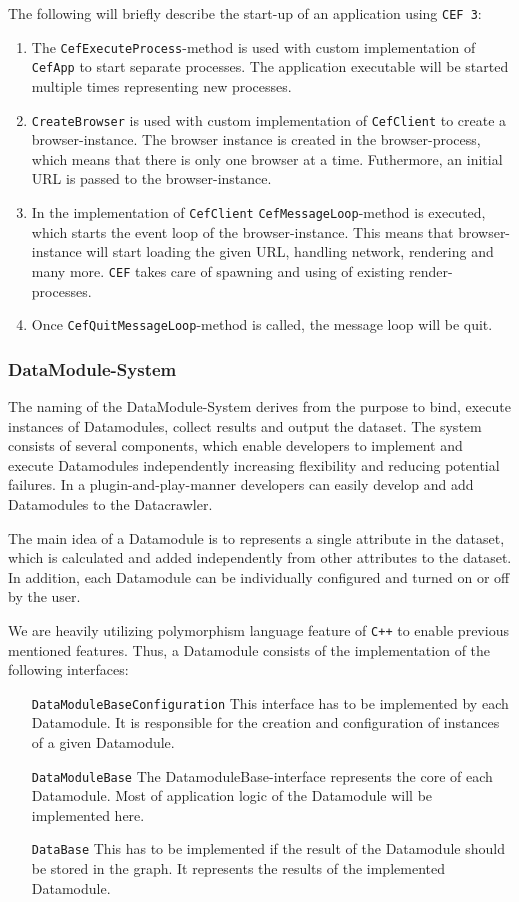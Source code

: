 The following will briefly describe the start-up of an application using \texttt{CEF 3}:
\begin{enumerate}
	\item The \texttt{CefExecuteProcess}-method is used with custom implementation of \texttt{CefApp} to start separate processes. The application executable will be started multiple times representing new processes.
	\item \texttt{CreateBrowser} is used with custom implementation of \texttt{CefClient} to create a browser-instance. The browser instance is created in the browser-process, which means that there is only one browser at a time. Futhermore, an initial URL is passed to the browser-instance.
	\item In the implementation of \texttt{CefClient} \texttt{CefMessageLoop}-method is executed, which starts the event loop of the browser-instance. This means that browser-instance will start loading the given URL, handling network, rendering and many more. \texttt{CEF} takes care of spawning and using of existing render-processes.
	\item Once \texttt{CefQuitMessageLoop}-method is called, the message loop will be quit.
\end{enumerate}

\subsubsection{DataModule-System}
\label{datacrawler_datamodulesystem}
The naming of the DataModule-System derives from the purpose to bind, execute instances of Datamodules, collect results and output the dataset. The system consists of several components, which enable developers to implement and execute Datamodules independently increasing flexibility and reducing potential failures. In a plugin-and-play-manner developers can easily develop and add Datamodules to the Datacrawler.

The main idea of a Datamodule is to represents a single attribute in the dataset, which is calculated and added independently from other attributes to the dataset. In addition, each Datamodule can be individually configured and turned on or off by the user.

 We are heavily utilizing polymorphism language feature of \texttt{C++} to enable previous mentioned features. Thus, a Datamodule consists of the implementation of the following interfaces:

\begin{itemize}
	\item[\texttt{DataModuleBaseConfiguration}] This interface has to be implemented by each Datamodule. It is responsible for the creation and configuration of instances of a given Datamodule.
	\item[\texttt{DataModuleBase}] The DatamoduleBase-interface represents the core of each Datamodule. Most of application logic of the Datamodule will be implemented here.
	\item[\texttt{DataBase}] This has to be implemented if the result of the Datamodule should be stored in the graph. It represents the results of the implemented Datamodule.
\end{itemize}

